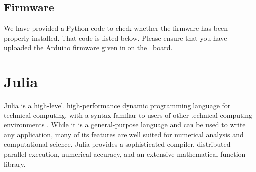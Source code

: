 \subsection{Firmware}
\lstset{style=mystyle}
\label{sec:test-firmware-python}
We have provided a Python code to check whether the firmware has been properly installed. That code is listed below.  
Please ensure that you have uploaded the Arduino firmware given in  on the \arduino\ board.

\begin{pycode}
      \label{py:test-firmware}
      
\end{pycode}





\section{Julia} \label{sec:julia-start}
Julia is a high-level, high-performance dynamic programming language for 
technical computing, with a syntax familiar to users of other technical computing 
environments \cite{julia-ref}. While it is a general-purpose language and can be used to write any 
application, many of its features are well suited for numerical analysis and 
computational science. Julia provides a sophisticated compiler, distributed 
parallel execution, numerical accuracy, and an extensive mathematical function
library. 


